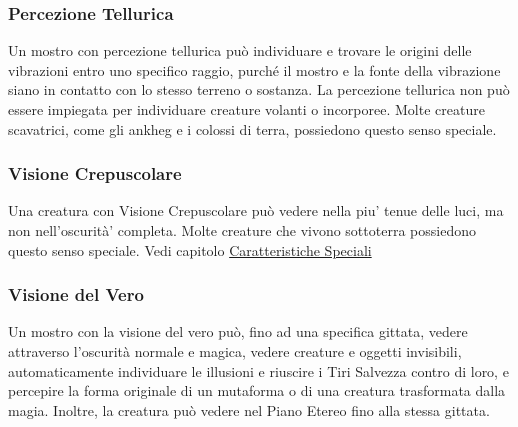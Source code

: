 \begin{multicols}{2}
\subsubsection{Percezione Tellurica}

Un mostro con percezione tellurica può individuare e trovare le origini delle vibrazioni entro uno specifico raggio, purché il mostro e la fonte della vibrazione siano in contatto con lo stesso terreno o sostanza. La percezione tellurica non può essere impiegata per individuare creature volanti o incorporee. Molte creature scavatrici, come gli ankheg e i colossi di terra, possiedono questo senso speciale.

\subsubsection{Visione Crepuscolare}

Una creatura con Visione Crepuscolare può vedere nella piu' tenue delle luci, ma non nell'oscurità' completa. Molte creature che vivono sottoterra possiedono questo senso
speciale.  Vedi capitolo \hyperref[sec:sec:visione-e-luce]{Caratteristiche Speciali}

\subsubsection{Visione del Vero}

Un mostro con la visione del vero può, fino ad una specifica gittata, vedere attraverso l'oscurità normale e magica, vedere creature e oggetti invisibili, automaticamente individuare le illusioni e riuscire i Tiri Salvezza contro di loro, e percepire la forma originale di un mutaforma o di una creatura trasformata dalla magia. Inoltre, la creatura può vedere nel Piano Etereo fino alla stessa gittata.


\end{multicols}
